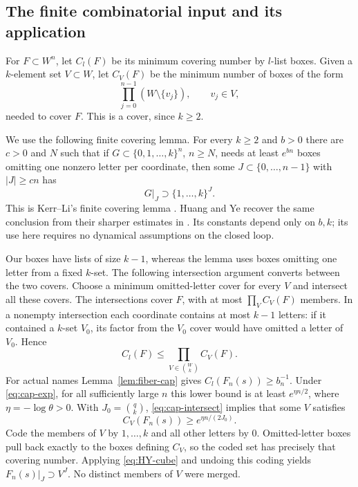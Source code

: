 \documentclass[11pt,reqno]{amsart}
\numberwithin{equation}{section}
\theoremstyle{definition}
\theoremstyle{definition}
\begin{document}
\subsection{The finite combinatorial input and its application}
For $F\subset W^n$, let $C_l(F)$ be its minimum covering number by
$l$-list boxes. Given a $k$-element set $V\subset W$, let $C_V(F)$
be the minimum number of boxes of the form
\[
 \prod_{j=0}^{n-1}(W\setminus\{v_j\}),\qquad v_j\in V,
\]
needed to cover $F$. This is a cover, since $k\ge2$.

We use the following finite covering lemma. For every
$k\ge2$ and $b>0$ there are $c>0$ and $N$ such that if
$G\subset\{0,1,\ldots,k\}^n$, $n\ge N$, needs at least
$e^{bn}$ boxes omitting one nonzero letter per coordinate, then some
$J\subset\{0,\ldots,n-1\}$ with $|J|\ge cn$ has
\begin{equation}\label{eq:HY-cube}
 G|_J\supset\{1,\ldots,k\}^{J}.
\end{equation}
This is Kerr--Li's finite covering lemma
\cite[Lemma~3.3]{KL2007}. Huang and Ye recover the same conclusion
from their sharper estimates in \cite[Lemma~4.1 and Remark~4.2,
pp.~1701--1705]{HuangYe2009}. Its constants depend only on $b,k$;
its use here requires no dynamical assumptions on the closed loop.

Our boxes have lists of size $k-1$, whereas the lemma uses boxes
omitting one letter from a fixed $k$-set. The following intersection
argument converts between the two covers. Choose a minimum omitted-letter cover for every $V$ and
intersect all these covers. The intersections cover $F$, with at most
$\prod_V C_V(F)$ members. In a nonempty intersection each coordinate
contains at most $k-1$ letters: if it contained a $k$-set $V_0$, its
factor from the $V_0$ cover would have omitted a letter of $V_0$.
Hence
\begin{equation}\label{eq:cap-intersect}
 C_l(F)\le\prod_{V\in\binom Wk}C_V(F).
\end{equation}
For actual names Lemma~\ref{lem:fiber-cap} gives
$C_l(F_n(s))\ge b_n^{-1}$. Under \eqref{eq:cap-exp}, for all
sufficiently large $n$ this lower bound is at least
$e^{\eta n/2}$, where $\eta=-\log\theta>0$. With
$J_0=\binom qk$, \eqref{eq:cap-intersect} implies that some $V$
satisfies
\[
 C_V(F_n(s))\ge e^{\eta n/(2J_0)}.
\]
Code the members of $V$ by $1,\ldots,k$ and all other letters by
$0$. Omitted-letter boxes pull back exactly to the boxes defining
$C_V$, so the coded set has precisely that covering number. Applying
\eqref{eq:HY-cube} and undoing this coding yields
$F_n(s)|_J\supset V^J$. No distinct members of $V$ were merged.
\end{document}
